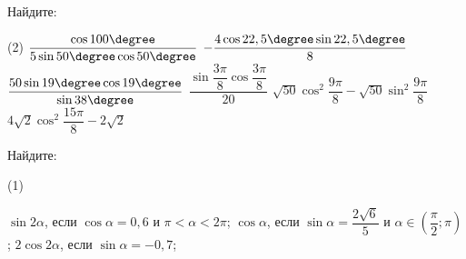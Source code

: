\begin{class}[number=4]
	\begin{listofex}
		\item Найдите:
		\begin{tasks}(2)
			\task \( \dfrac{ \cos 100 \degree }{ 5\sin 50 \degree \cos 50 \degree } \)
			\task \( -\dfrac{ 4\cos 22,5 \degree \sin 22,5 \degree }{ 8 } \)
			\task \( \dfrac{ 50 \sin 19 \degree \cos 19 \degree }{ \sin 38 \degree } \)
			\task \( \dfrac{ \sin \dfrac{ 3\pi }{8 } \cos \dfrac{ 3\pi }{ 8 } }{ 20 } \)
			\task \( \sqrt{50} \cos^2 \dfrac{ 9\pi }{ 8 } - \sqrt{50} \sin^2 \dfrac{ 9\pi }{ 8 } \)
			\task \( 4\sqrt{2} \cos^2 \dfrac{ 15\pi }{ 8 } -2\sqrt{2} \)
		\end{tasks}
		\item Найдите: %
		\begin{tasks}(1)
			
			\task \(\sin 2 \alpha \), если \( \cos \alpha = 0,6 \) и \( \pi < \alpha < 2 \pi \);
			\task \( \cos \alpha \), если \( \sin \alpha = \dfrac{ 2 \sqrt{6} }{ 5 } \) и \( \alpha \in \left( \dfrac{ \pi }{ 2 }; \pi \right) \);
			\task \( 2\cos 2 \alpha \), если \( \sin \alpha=-0,7 \);
			
			
		\end{tasks}
		

\end{listofex}
\end{class}
